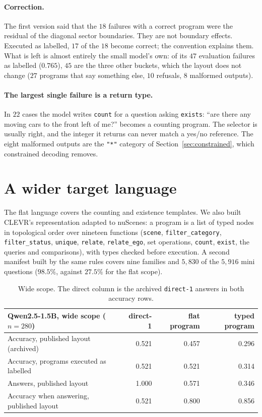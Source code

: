 \documentclass[11pt,a4paper]{article}
\newcommand{\code}[1]{\texttt{\small #1}}
\begin{document}
\paragraph{Correction.} The first version said that the $18$ failures with a
correct program were the residual of the diagonal sector boundaries. They are
not boundary effects. Executed as labelled, $17$ of the $18$ become correct;
the convention explains them. What is left is almost entirely the small
model's own: of its $47$ evaluation failures as labelled ($0.765$), $45$ are
the three other buckets, which the layout does not change ($27$ programs
that say something else, $10$ refusals, $8$ malformed outputs).

\paragraph{The largest single failure is a return type.} In $22$ cases the
model writes \code{count} for a question asking \code{exists}: ``are there
any moving cars to the front left of me?'' becomes a counting program. The
selector is usually right, and the integer it returns can never match a
yes/no reference. The eight malformed outputs are the \code{"*"} category of
Section~\ref{sec:constrained}, which constrained decoding removes.

\section{A wider target language}
\label{sec:wide}

The flat language covers the counting and existence templates. We also built
CLEVR's representation \cite{clevr} adapted to nuScenes: a program is a list
of typed nodes in topological order over nineteen functions (\code{scene},
\code{filter\_category}, \code{filter\_status}, \code{unique},
\code{relate}, \code{relate\_ego}, set operations, \code{count},
\code{exist}, the queries and comparisons), with types checked before
execution. A second manifest built by the
same rules covers nine families and $5{,}830$ of the $5{,}916$ mini questions
($98.5\%$, against $27.5\%$ for the flat scope).

\begin{table}[ht]
\centering
\small
\begin{tabular}{lrrr}
\toprule
Qwen2.5-1.5B, wide scope ($n = 280$) & direct-1 & flat program & typed program \\
\midrule
Accuracy, published layout (archived)    & 0.521 & 0.457 & 0.296 \\
Accuracy, programs executed as labelled  & 0.521 & 0.521 & 0.314 \\
\midrule
Answers, published layout                & 1.000 & 0.571 & 0.346 \\
Accuracy when answering, published layout & 0.521 & 0.800 & 0.856 \\
\bottomrule
\end{tabular}
\caption{Wide scope. The direct column is the archived \code{direct-1}
answers in both accuracy rows.}
\label{tab:wide}
\end{table}
\end{document}
